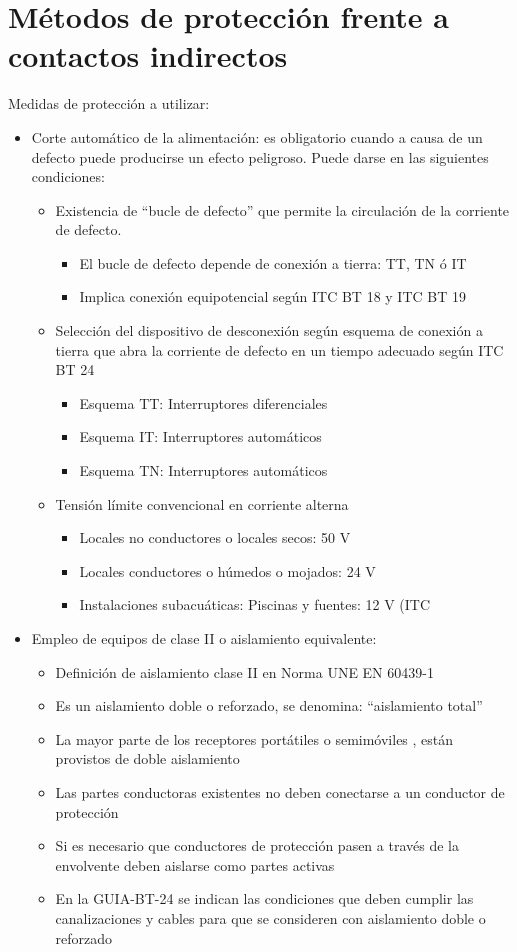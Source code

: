 \section{Métodos de protección frente a contactos indirectos}
Medidas de protección a utilizar:
\begin{itemize}
	\item Corte automático de la alimentación: es obligatorio cuando a causa de un defecto puede producirse un efecto peligroso. Puede darse en las siguientes condiciones:
	\begin{itemize}
		\item Existencia de “bucle de defecto” que permite la circulación de la corriente de
		defecto.
		\begin{itemize}
			\item El bucle de defecto depende de conexión a tierra: TT, TN ó IT
			\item  Implica conexión equipotencial según ITC BT 18 y ITC BT 19
		\end{itemize}
		\item Selección del dispositivo de desconexión según esquema de conexión a tierra
		que abra la corriente de defecto en un tiempo adecuado según ITC BT 24
		\begin{itemize}
			\item Esquema TT: Interruptores diferenciales
			\item Esquema IT: Interruptores automáticos
			\item Esquema TN: Interruptores automáticos
		\end{itemize}
		\item Tensión
		límite convencional en corriente alterna
		\begin{itemize}
			\item Locales no conductores o locales secos: 50 V
			\item Locales conductores o húmedos o mojados: 24 V
			\item Instalaciones subacuáticas: Piscinas y fuentes: 12 V (ITC
		\end{itemize}
	\end{itemize}
	\item Empleo de equipos de clase II o aislamiento equivalente: 
	\begin{itemize}
		\item Definición de aislamiento clase II en Norma UNE EN 60439-1
		\item Es un aislamiento doble o reforzado, se denomina: “aislamiento total”
		\item La mayor parte de los receptores portátiles o semimóviles , están
		provistos de doble aislamiento
		\item
		Las partes conductoras existentes no deben conectarse a un conductor
		de protección
		\item
		Si es necesario que conductores de protección pasen a través de la
		envolvente deben aislarse como partes activas
		\item
		En la GUIA-BT-24 se indican las condiciones que deben cumplir las
		canalizaciones y cables para que se consideren con aislamiento doble o
		reforzado
	\end{itemize}
\end{itemize}

